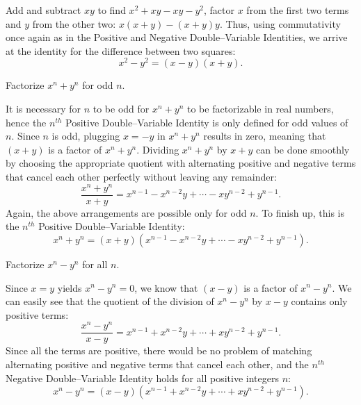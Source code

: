 \begin{solution}[name=Solution by Amir Parvardi]
Add and subtract $xy$ to find $x^2+xy-xy-y^2$, factor $x$ from the first two terms and $y$ from the other two: $x(x+y)-(x+y)y$. Thus, using commutativity once again as in the Positive and Negative Double--Variable Identities, we arrive at the identity for the difference between two squares: $$x^2-y^2=(x-y)(x+y).$$
\end{solution}

\begin{tcolorbox}
\begin{question}[name=($n^{\text{th}}$ Positive Double--Variable Identity)]
Factorize $x^n+y^n$ for odd $n$.
\end{question}
\end{tcolorbox}

\begin{solution}[name=Solution by Amir Parvardi]
It is necessary for $n$ to be odd for $x^n+y^n$ to be factorizable in real numbers, hence the $n^{th}$ Positive Double--Variable Identity is only defined for odd values of $n$. Since $n$ is odd, plugging $x=-y$ in $x^n+y^n$ results in zero, meaning that $(x+y)$ is a factor of $x^n+y^n$. Dividing $x^n+y^n$ by $x+y$ can be done smoothly by choosing the appropriate quotient with alternating positive and negative terms that cancel each other perfectly without leaving any remainder:
$$\frac{x^n+y^n}{x+y} = x^{n-1}-x^{n-2}y+\cdots-xy^{n-2}+y^{n-1}.$$
Again, the above arrangements are possible only for odd $n$. To finish up, this is the $n^{th}$ Positive Double--Variable Identity:
$$x^n+y^n = (x+y)\left(x^{n-1}-x^{n-2}y+\cdots-xy^{n-2}+y^{n-1}\right).$$
\end{solution}




\begin{tcolorbox}
\begin{question}[name=($n^{\text{th}}$ Negative Double--Variable Identity)]
Factorize $x^n-y^n$ for all $n$.
\end{question}
\end{tcolorbox}

\begin{solution}[name=Solution by Amir Parvardi]
Since $x=y$ yields $x^n-y^n=0$, we know that $(x-y)$ is a factor of $x^n-y^n$. We can easily see that the quotient of the division of $x^n-y^n$ by $x-y$ contains only positive terms:
$$\frac{x^n-y^n}{x-y} = x^{n-1}+x^{n-2}y+\cdots+xy^{n-2}+y^{n-1}.$$
Since all the terms are positive, there would be no problem of matching alternating positive and negative terms that cancel each other, and the $n^{th}$ Negative Double--Variable Identity holds for all positive integers $n$:
$$x^n-y^n = (x-y)\left(x^{n-1}+x^{n-2}y+\cdots+xy^{n-2}+y^{n-1}\right).$$
\end{solution}



